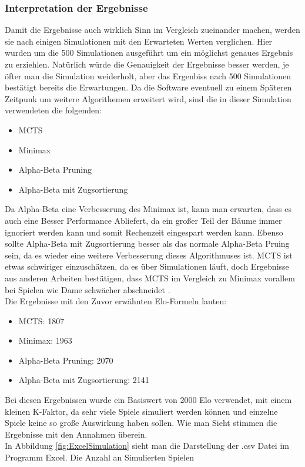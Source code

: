 \documentclass[12pt,a4paper,bibliography=totocnumbered,listof=totocnumbered]{article}
\begin{document}
\subsubsection{Interpretation der Ergebnisse}
Damit die Ergebnisse auch wirklich Sinn im Vergleich zueinander machen, werden sie nach einigen Simulationen mit den Erwarteten Werten verglichen.
Hier wurden um die 500 Simulationen ausgeführt um ein möglichst genaues Ergebnis zu erziehlen. Natürlich würde die Genauigkeit der Ergebnisse 
besser werden, je öfter man die Simulation weiderholt, aber das Ergenbiss nach 500 Simulationen bestätigt bereits die Erwartungen.
Da die Software eventuell zu einem Späteren Zeitpunk um weitere Algorithemen erweitert wird, sind die in dieser Simulation verwendeten die folgenden:
\begin{itemize}
    \item MCTS
    \item Minimax 
    \item Alpha-Beta Pruning
    \item Alpha-Beta mit Zugsortierung 
\end{itemize}
Da Alpha-Beta eine Verbesserung des Minimax ist, kann man erwarten, dass es auch eine Besser Performance Abliefert, da ein großer Teil der Bäume 
immer ignoriert werden kann und somit Rechenzeit eingespart werden kann. Ebenso sollte Alpha-Beta mit Zugsortierung besser als das normale 
Alpha-Beta Pruing sein, da es wieder eine weitere Verbesserung dieses Algorithmuses ist. MCTS ist etwas schwiriger einzuschätzen, da 
es über Simulationen läuft, doch Ergebnisse aus anderen Arbeiten bestätigen, dass MCTS im Vergleich zu Minimax vorallem bei Spielen wie Dame 
schwächer abschneidet \cite{MiniaxMCTScomparison}.
\\
Die Ergebnisse mit den Zuvor erwähnten Elo-Formeln lauten:
\begin{itemize}
    \item MCTS: 1807
    \item Minimax: 1963
    \item Alpha-Beta Pruning: 2070
    \item Alpha-Beta mit Zugsortierung: 2141
\end{itemize}
Bei diesen Ergebnissen wurde ein Basiswert von 2000 Elo verwendet, mit einem kleinen K-Faktor, da sehr viele Spiele simuliert werden können und 
einzelne Spiele keine so große Auswirkung haben sollen. Wie man Sieht stimmen die Ergebnisse mit den Annahmen überein.
\\
In Abbildung \ref{fig:ExcelSimulation} sieht man die Darstellung der .csv Datei im Programm Excel. Die Anzahl an Simulierten Spielen
\end{document}
